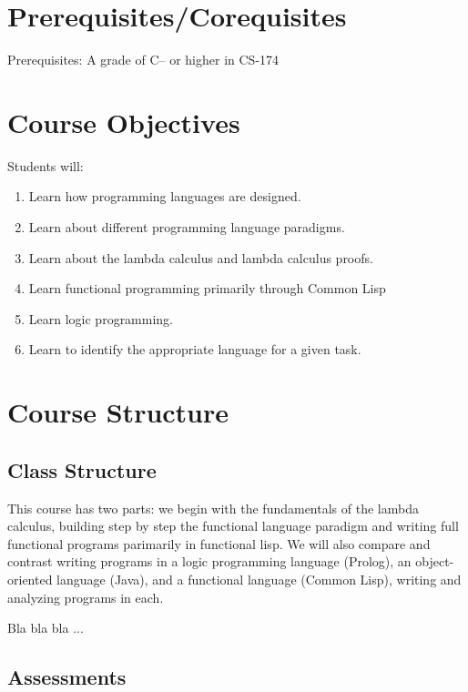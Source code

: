 \documentclass[11pt]{article}
\begin{document}

\section*{Prerequisites/Corequisites}
Prerequisites: A grade of C– or higher in CS-174


\section*{Course Objectives}
Students will:
\begin{enumerate}
\item Learn how programming languages are designed.
\item Learn about different programming language paradigms.
\item Learn about the lambda calculus and lambda calculus proofs.
\item Learn functional programming primarily through Common Lisp
\item Learn logic programming.
\item Learn to identify the appropriate language for a given task.
\end{enumerate}


\section*{Course Structure}

\subsection*{Class Structure}
This course has two parts: we begin with the fundamentals of the
lambda calculus, building step by step the functional language
paradigm and writing full functional programs parimarily in functional
lisp.  We will also compare and contrast writing programs in a logic
programming language (Prolog), an object-oriented language (Java), and
a functional language (Common Lisp), writing and analyzing programs in
each.



\bigskip

Bla bla bla ...

\subsection*{Assessments}
\end{document}
